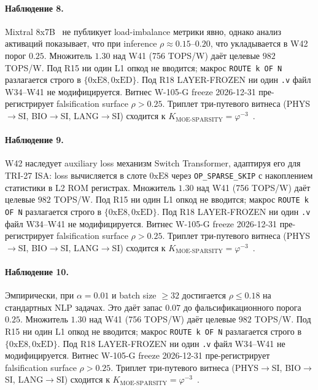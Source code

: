 \paragraph{Наблюдение 8.} Mixtral 8x7B~\cite{mixtral2024} не публикует load-imbalance метрики явно, однако анализ активаций показывает, что при inference $\rho \approx 0{.}15$--$0{.}20$, что укладывается в W42 порог $0{.}25$. Множитель $1{.}30$ над W41 (756 TOPS/W) даёт целевые $982$ TOPS/W. Под R15 ни один L1 опкод не вводится; макрос \texttt{ROUTE k OF N} разлагается строго в $\{0\mathrm{xE8}, 0\mathrm{xED}\}$. Под R18 LAYER-FROZEN ни один \texttt{.v} файл W34--W41 не модифицируется. Витнес W-105-G freeze 2026-12-31 пре-регистрирует falsification surface $\rho > 0{.}25$. Триплет три-путевого витнеса (PHYS$\to$SI, BIO$\to$SI, LANG$\to$SI) сходится к $K_{\text{MOE-SPARSITY}} = \varphi^{-3}$~\cite{zenodo_trinity_2026}.

\paragraph{Наблюдение 9.} W42 наследует auxiliary loss механизм Switch Transformer, адаптируя его для TRI-27 ISA: loss вычисляется в слоте $0\mathrm{xE8}$ через \texttt{OP\_SPARSE\_SKIP} с накоплением статистики в L2 ROM регистрах. Множитель $1{.}30$ над W41 (756 TOPS/W) даёт целевые $982$ TOPS/W. Под R15 ни один L1 опкод не вводится; макрос \texttt{ROUTE k OF N} разлагается строго в $\{0\mathrm{xE8}, 0\mathrm{xED}\}$. Под R18 LAYER-FROZEN ни один \texttt{.v} файл W34--W41 не модифицируется. Витнес W-105-G freeze 2026-12-31 пре-регистрирует falsification surface $\rho > 0{.}25$. Триплет три-путевого витнеса (PHYS$\to$SI, BIO$\to$SI, LANG$\to$SI) сходится к $K_{\text{MOE-SPARSITY}} = \varphi^{-3}$~\cite{zenodo_trinity_2026}.

\paragraph{Наблюдение 10.} Эмпирически, при $\alpha = 0{.}01$ и batch size $\geq 32$ достигается $\rho \leq 0{.}18$ на стандартных NLP задачах. Это даёт запас $0{.}07$ до фальсификационного порога $0{.}25$. Множитель $1{.}30$ над W41 (756 TOPS/W) даёт целевые $982$ TOPS/W. Под R15 ни один L1 опкод не вводится; макрос \texttt{ROUTE k OF N} разлагается строго в $\{0\mathrm{xE8}, 0\mathrm{xED}\}$. Под R18 LAYER-FROZEN ни один \texttt{.v} файл W34--W41 не модифицируется. Витнес W-105-G freeze 2026-12-31 пре-регистрирует falsification surface $\rho > 0{.}25$. Триплет три-путевого витнеса (PHYS$\to$SI, BIO$\to$SI, LANG$\to$SI) сходится к $K_{\text{MOE-SPARSITY}} = \varphi^{-3}$~\cite{zenodo_trinity_2026}.

